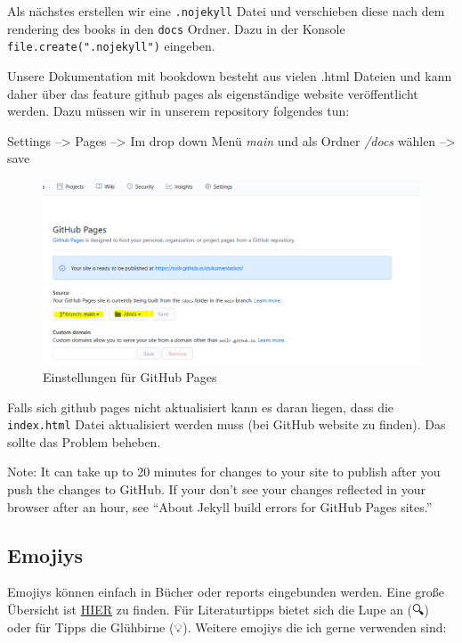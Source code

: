 \documentclass[
]{article}
\begin{document}
Als nächstes erstellen wir eine \texttt{.nojekyll} Datei und verschieben diese nach dem rendering des books in den \texttt{docs} Ordner. Dazu in der Konsole \texttt{file.create(".nojekyll")} eingeben.

Unsere Dokumentation mit bookdown besteht aus vielen .html Dateien und kann daher über das feature github pages als eigenständige website veröffentlicht werden. Dazu müssen wir in unserem repository folgendes tun:

Settings --\textgreater{} Pages --\textgreater{} Im drop down Menü \emph{main} und als Ordner \emph{/docs} wählen --\textgreater{} save

\begin{figure}

{\centering \includegraphics[width=1\linewidth]{images/072} 

}

\caption{Einstellungen für GitHub Pages}\label{fig:unnamed-chunk-309}
\end{figure}

Falls sich github pages nicht aktualisiert kann es daran liegen, dass die \texttt{index.html} Datei aktualisiert werden muss (bei GitHub website zu finden). Das sollte das Problem beheben.

Note: It can take up to 20 minutes for changes to your site to publish after you push the changes to GitHub. If your don't see your changes reflected in your browser after an hour, see ``About Jekyll build errors for GitHub Pages sites.''

\hypertarget{emojiys}{%
\subsection{Emojiys}\label{emojiys}}

Emojiys können einfach in Bücher oder reports eingebunden werden. Eine große Übersicht ist \href{https://github.com/hadley/emo}{HIER} zu finden. Für Literaturtipps bietet sich die Lupe an (🔍) oder für Tipps die Glühbirne (💡). Weitere emojiys die ich gerne verwenden sind:
\end{document}

